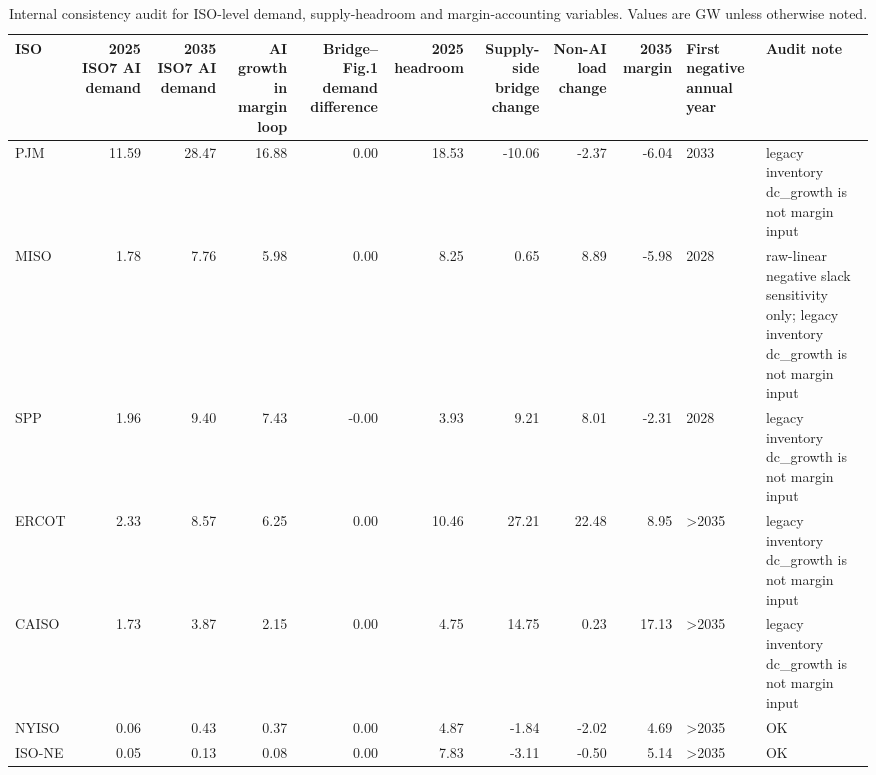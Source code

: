 \begin{table}
\caption{Internal consistency audit for ISO-level demand, supply-headroom and margin-accounting variables. Values are GW unless otherwise noted.}
\label{tab:internal-consistency-audit}
\begin{tabular}{lrrrrrrrrll}
\toprule
ISO & 2025 ISO7 AI demand & 2035 ISO7 AI demand & AI growth in margin loop & Bridge--Fig.1 demand difference & 2025 headroom & Supply-side bridge change & Non-AI load change & 2035 margin & First negative annual year & Audit note \\
\midrule
PJM & 11.59 & 28.47 & 16.88 & 0.00 & 18.53 & -10.06 & -2.37 & -6.04 & 2033 & legacy inventory dc\_growth is not margin input \\
MISO & 1.78 & 7.76 & 5.98 & 0.00 & 8.25 & 0.65 & 8.89 & -5.98 & 2028 & raw-linear negative slack sensitivity only; legacy inventory dc\_growth is not margin input \\
SPP & 1.96 & 9.40 & 7.43 & -0.00 & 3.93 & 9.21 & 8.01 & -2.31 & 2028 & legacy inventory dc\_growth is not margin input \\
ERCOT & 2.33 & 8.57 & 6.25 & 0.00 & 10.46 & 27.21 & 22.48 & 8.95 & >2035 & legacy inventory dc\_growth is not margin input \\
CAISO & 1.73 & 3.87 & 2.15 & 0.00 & 4.75 & 14.75 & 0.23 & 17.13 & >2035 & legacy inventory dc\_growth is not margin input \\
NYISO & 0.06 & 0.43 & 0.37 & 0.00 & 4.87 & -1.84 & -2.02 & 4.69 & >2035 & OK \\
ISO-NE & 0.05 & 0.13 & 0.08 & 0.00 & 7.83 & -3.11 & -0.50 & 5.14 & >2035 & OK \\
\bottomrule
\end{tabular}
\end{table}
